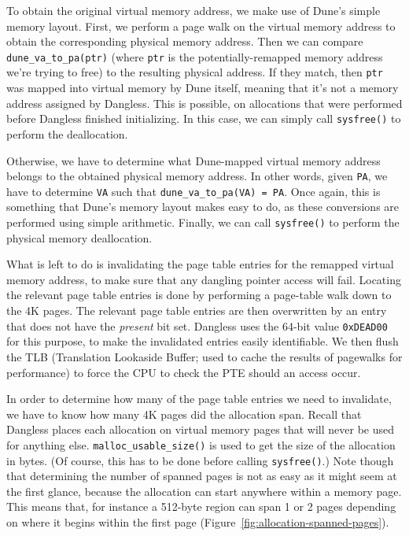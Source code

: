 To obtain the original virtual memory address, we make use of Dune's simple memory layout. First, we perform a page walk on the virtual memory address to obtain the corresponding physical memory address. Then we can compare \lstinline!dune_va_to_pa(ptr)! (where \lstinline!ptr! is the potentially-remapped memory address we're trying to free) to the resulting physical address.
If they match, then \lstinline!ptr! was mapped into virtual memory by Dune itself, meaning that it's not a memory address assigned by Dangless. This is possible, on allocations that were performed before Dangless finished initializing. In this case, we can simply call \lstinline!sysfree()! to perform the deallocation.

Otherwise, we have to determine what Dune-mapped virtual memory address belongs to the obtained physical memory address. In other words, given \lstinline!PA!, we have to determine \lstinline!VA! such that \lstinline!dune_va_to_pa(VA) = PA!. Once again, this is something that Dune's memory layout makes easy to do, as these conversions are performed using simple arithmetic. Finally, we can call \lstinline!sysfree()! to perform the physical memory deallocation.

What is left to do is invalidating the page table entries for the remapped virtual memory address, to make sure that any dangling pointer access will fail. Locating the relevant page table entries is done by performing a page-table walk down to the 4K pages. The relevant page table entries are then overwritten by an entry that does not have the \emph{present} bit set. Dangless uses the 64-bit value \lstinline!0xDEAD00! for this purpose, to make the invalidated entries easily identifiable. We then flush the TLB (Translation Lookaside Buffer; used to cache the results of pagewalks for performance) to force the CPU to check the PTE should an access occur.

In order to determine how many of the page table entries we need to invalidate, we have to know how many 4K pages did the allocation span. Recall that Dangless places each allocation on virtual memory pages that will never be used for anything else. \lstinline!malloc_usable_size()! is used to get the size of the allocation in bytes. (Of course, this has to be done before calling \lstinline!sysfree()!.) Note though that determining the number of spanned pages is not as easy as it might seem at the first glance, because the allocation can start anywhere within a memory page. This means that, for instance a 512-byte region can span 1 or 2 pages depending on where it begins within the first page (Figure~\ref{fig:allocation-spanned-pages}).

